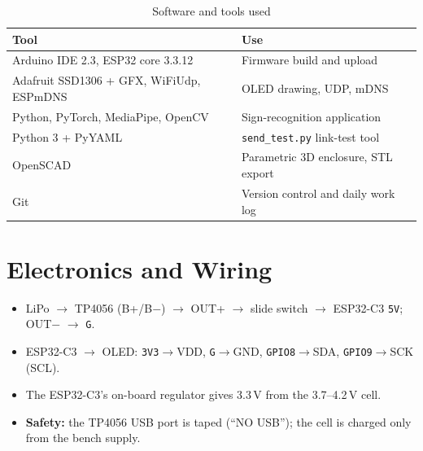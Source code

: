 \documentclass[12pt,a4paper]{report}
\begin{document}
\begin{table}[H]
\centering
\caption{Software and tools used}
\label{tab:sw}
\begin{tabularx}{\linewidth}{L{5.2cm} X}
\toprule
\textbf{Tool} & \textbf{Use} \\
\midrule
Arduino IDE 2.3, ESP32 core 3.3.12 & Firmware build and upload \\
Adafruit SSD1306 + GFX, WiFiUdp, ESPmDNS & OLED drawing, UDP, mDNS \\
Python, PyTorch, MediaPipe, OpenCV & Sign-recognition application \\
Python 3 + PyYAML & \texttt{send\_test.py} link-test tool \\
OpenSCAD & Parametric 3D enclosure, STL export \\
Git & Version control and daily work log \\
\bottomrule
\end{tabularx}
\end{table}

\section{Electronics and Wiring}
\begin{itemize}
  \item LiPo $\rightarrow$ TP4056 (B+/B$-$) $\rightarrow$ OUT+ $\rightarrow$ slide switch $\rightarrow$ ESP32-C3 \texttt{5V}; OUT$-$ $\rightarrow$ \texttt{G}.
  \item ESP32-C3 $\rightarrow$ OLED: \texttt{3V3}$\rightarrow$VDD, \texttt{G}$\rightarrow$GND, \texttt{GPIO8}$\rightarrow$SDA, \texttt{GPIO9}$\rightarrow$SCK (SCL).
  \item The ESP32-C3's on-board regulator gives 3.3\,V from the 3.7--4.2\,V cell.
  \item \textbf{Safety:} the TP4056 USB port is taped (``NO USB''); the cell is charged only from the bench supply.
\end{itemize}
\end{document}
